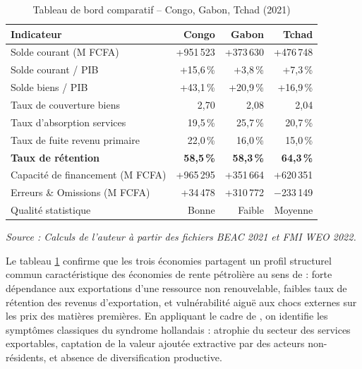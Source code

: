 \documentclass[12pt,a4paper]{article}
\begin{document}
\begin{table}[h!]
  \centering
  \caption{Tableau de bord comparatif -- Congo, Gabon, Tchad (2021)}
  \label{tab:diagnostic}
  \begin{tabularx}{\linewidth}{X r r r}
    \toprule
    \textbf{Indicateur}              & \textbf{Congo} & \textbf{Gabon} & \textbf{Tchad} \\
    \midrule
    Solde courant (M FCFA)           & +951\,523 & +373\,630 & +476\,748 \\
    Solde courant / PIB              & +15,6\,\% &  +3,8\,\% &  +7,3\,\% \\
    Solde biens / PIB                & +43,1\,\% & +20,9\,\% & +16,9\,\% \\
    Taux de couverture biens         &  2,70     &   2,08    &  2,04     \\
    Taux d'absorption services       & 19,5\,\%  & 25,7\,\%  & 20,7\,\%  \\
    Taux de fuite revenu primaire    & 22,0\,\%  & 16,0\,\%  & 15,0\,\%  \\
    \textbf{Taux de rétention}       & \textbf{58,5\,\%} & \textbf{58,3\,\%} & \textbf{64,3\,\%} \\
    Capacité de financement (M FCFA) & +965\,295 & +351\,664 & +620\,351 \\
    Erreurs \& Omissions (M FCFA)   & +34\,478  & +310\,772 & $-$233\,149 \\
    Qualité statistique              & Bonne     & Faible    & Moyenne   \\
    \bottomrule
  \end{tabularx}

  \smallskip
  \footnotesize\textit{Source : Calculs de l'auteur à partir des fichiers BEAC 2021 et FMI WEO 2022.}
\end{table}

Le tableau \ref{tab:diagnostic} confirme que les trois économies partagent un profil
structurel commun caractéristique des économies de rente pétrolière au sens de
\textcite{sachswarner1995} : forte dépendance aux exportations d'une ressource non
renouvelable, faibles taux de rétention des revenus d'exportation, et vulnérabilité aiguë
aux chocs externes sur les prix des matières premières. En appliquant le cadre de
\textcite{cordenneary1982}, on identifie les symptômes classiques du syndrome hollandais :
atrophie du secteur des services exportables, captation de la valeur ajoutée extractive par
des acteurs non-résidents, et absence de diversification productive.
\end{document}
